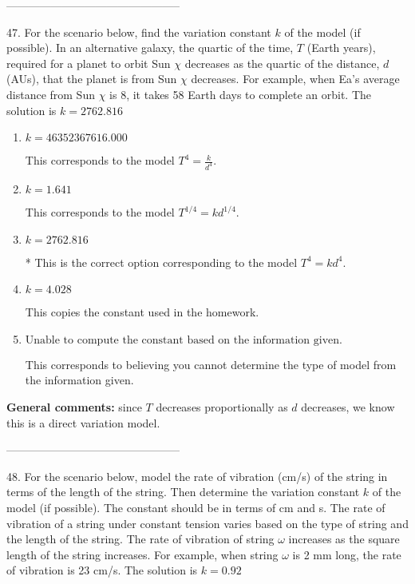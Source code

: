 \documentclass{extbook}[14pt]
\begin{document}
-----------------------------------------------

47. For the scenario below, find the variation constant $k$ of the model (if possible).
In an alternative galaxy, the quartic of the time, $T$ (Earth years), required for a planet to orbit Sun $\chi$ decreases as the quartic of the distance, $d$ (AUs), that the planet is from Sun $\chi$ decreases. For example, when Ea's average distance from Sun $\chi$ is 8, it takes 58 Earth days to complete an orbit. 
The solution is $ k = 2762.816 $ 

\begin{enumerate}[label=\Alph*.] 
\item $ k = 46352367616.000 $ 

 This corresponds to the model $T^{4} = \frac{k}{d^{4}}$. 
\item $ k = 1.641 $ 

 This corresponds to the model $T^{1/4} = k d^{1/4}$. 
\item $ k = 2762.816 $ 

 * This is the correct option corresponding to the model $T^{4} = k d^{4}$. 
\item $ k = 4.028 $ 

 This copies the constant used in the homework. 
\item $ \text{Unable to compute the constant based on the information given.} $ 

 This corresponds to believing you cannot determine the type of model from the information given. 
\end{enumerate} 
 
\textbf{General comments:} since $T$ decreases proportionally as $d$ decreases, we know this is a direct variation model.

-----------------------------------------------

48. For the scenario below, model the rate of vibration (cm/s) of the string in terms of the length of the string. Then determine the variation constant $k$ of the model (if possible). The constant should be in terms of cm and s.
The rate of vibration of a string under constant tension varies based on the type of string and the length of the string. The rate of vibration of string $\omega$ increases as the square length of the string increases. For example, when string $\omega$ is 2 mm long, the rate of vibration is 23 cm/s. 
The solution is $ k = 0.92 $ 
\end{document}
